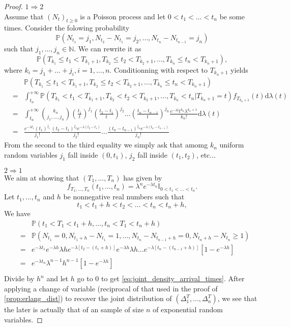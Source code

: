 \begin{proof}
\underline{$1 \Rightarrow 2$}\\
Assume that $(N_t)_{t\geq0}$ is a Poisson process and let $0<t_1<\ldots <t_n$ be some times. Consider the folowing probability 
$$
\mathbb{P}\left(N_{t_1} = j_1, N_{t_2}-N_{t_1} = j_2,\ldots, N_{t_n}-N_{t_{n-1}} = j_n\right)
$$
such that $j_1,\ldots, j_n\in \mathbb{N}$. We can rewrite it as 
$$
\mathbb{P}\left(T_{k_1}\leq t_1<T_{k_1+1}, T_{k_2}\leq t_2<T_{k_2+1},\ldots, T_{k_n} \leq t_n<T_{k_n+1}\right),
$$
where $k_i = j_1 + \ldots +j_i, i = 1,\ldots, n$. Conditionning with respect to  $T_{k_n+1}$ yields
\begin{eqnarray*}
&&\mathbb{P}\left(T_{k_1}\leq t_1<T_{k_1+1}, T_{k_2}\leq t_2<T_{k_2+1},\ldots, T_{k_n}\leq t_n<T_{k_n+1}\right)\\
&=&\int_{t_n}^{+\infty}\mathbb{P}\left(T_{k_1}<t_1<T_{k_1+1}, T_{k_2}<t_2<T_{k_2+1},\ldots, T_{k_n}<t_n|T_{k_n +1}=t\right)f_{T_{k_n+1}}(t)\text{d}\lambda(t)\\
&=& \int_{t_n}^{+\infty}\binom{k_n}{j_1,\ldots, j_n}\left(\frac{t_1}{t}\right)^{j_1}\left(\frac{t_2-t_1}{t}\right)^{j_2}\ldots \left(\frac{t_n-t_{n-1}}{t}\right)^{j_n}\frac{e^{-\lambda t}t^{k_n}\lambda^{k_n + 1}}{k_n!}\text{d}\lambda(t)\\
&=&\frac{e^{-\lambda t_1}\left(t_1\right)^{j_1}}{j_1!}\frac{\left(t_2-t_1\right)^{j_2}e^{-\lambda(t_2 - t_1)}}{j_2!}\ldots \frac{\left(t_n-t_{n-1}\right)^{j_n}e^{-\lambda(t_n - t_{n-1})}}{j_n!}
\end{eqnarray*}
From the second to the third equality we simply ask that amomg $k_n$ uniform random variables $j_1$ fall inside $(0,t_1)$, $j_2$ fall inside $(t_1,t_2)$, etc...


\noindent \underline{$2 \Rightarrow 1$}\\
We aim at showing that $(T_1,\ldots, T_n)$ has \pdf given by
\begin{equation}\label{eq:joint_density_arrival_times}
f_{T_1,\ldots, T_n}(t_1,\ldots, t_n)=\lambda^n e^{-\lambda t_n}\mathbb{I}_{0< t_1<\ldots<t_n}.
\end{equation}
Let $t_1,\ldots, t_n$ and $h$ be nonnegative real numbers such that
$$
t_1<t_1+h<t_2<\ldots<t_n<t_n+h,
$$ 
We have
\begin{eqnarray*}
&&\mathbb{P}(t_1<T_1<t_1+h,\ldots,t_n<T_1<t_n+h)\\
&=&\mathbb{P}(N_{t_1}=0,N_{t_1+h}-N_{t_1}=1,\ldots,N_{t_n}-N_{t_{n-1}+h}=0,N_{t_n+h}-N_{t_n}\geq 1)\\
&=&e^{-\lambda t_1}e^{-\lambda h}\lambda h e^{-\lambda [t_2-(t_1+h)]}e^{-\lambda h}\lambda h\ldots e^{-\lambda [t_n-(t_{n-1}+h)]}[1-e^{-\lambda h}] \\
&=&e^{-\lambda t_n}\lambda^{n-1}h^{n-1}[1-e^{-\lambda h}]\\
\end{eqnarray*}
Divide by $h^{n}$ and let $h$ go to $0$ to get \eqref{eq:joint_density_arrival_times}. After applying a change of variable (reciprocal of that used in the proof of \cref{prop:erlang_dist}) to recover the joint distribution of $(\Delta^{T}_1, \ldots, \Delta^{T}_n)$, we see that the later is actually that of an \iid sample of size $n$ of exponential random variables.
\end{proof}
